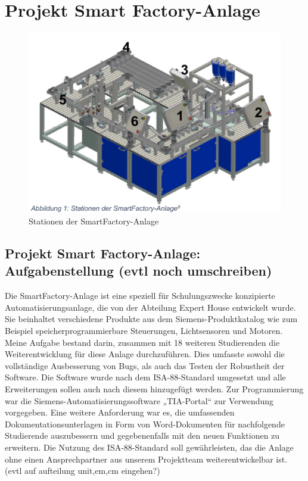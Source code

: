 \chapter{Projekt Smart Factory-Anlage}\label{ch:data}



\begin{figure}[h!]
    \centering
    \includegraphics{figures/Screenshot 2025-01-03 124137.png}
    \caption{Stationen der SmartFactory-Anlage\cite{siemens2022}} %
    \label{Stationen der SmartFactory-Anlage} %
\end{figure}

\section{Projekt Smart Factory-Anlage: Aufgabenstellung (evtl noch umschreiben)}\label{sec:Projekt Smart Factory-Anlage: Aufgabenstellung (evtl noch umschreiben)}

Die SmartFactory-Anlage ist eine speziell für Schulungszwecke konzipierte
Automatisierungsanlage, die von der Abteilung Expert House entwickelt wurde. Sie beinhaltet verschiedene Produkte aus dem Siemens-Produktkatalog wie zum Beispiel speicherprogrammierbare Steuerungen, Lichtsensoren und Motoren.
Meine Aufgabe bestand darin, zusammen mit 18 weiteren Studierenden die
Weiterentwicklung für diese Anlage durchzuführen. Dies umfasste sowohl die
vollständige Ausbesserung von Bugs, als auch das Testen der Robustheit der Software. Die Software wurde nach dem 
ISA-88-Standard umgesetzt und alle Erweiterungen sollen auch nach diesem hinzugefügt werden. Zur Programmierung war 
die Siemens-Automatisierungssoftware „TIA-Portal“ zur Verwendung vorgegeben. Eine weitere Anforderung war es, die 
umfassenden Dokumentationsunterlagen in Form von Word-Dokumenten für nachfolgende Studierende auszubessern und 
gegebenenfalls mit den neuen Funktionen zu erweitern. Die Nutzung des ISA-88-Standard soll gewährleisten, das die Anlage 
ohne einen Ansprechpartner aus unserem Projektteam weiterentwickelbar ist. 
(evtl auf aufteilung unit,em,cm eingehen?)


